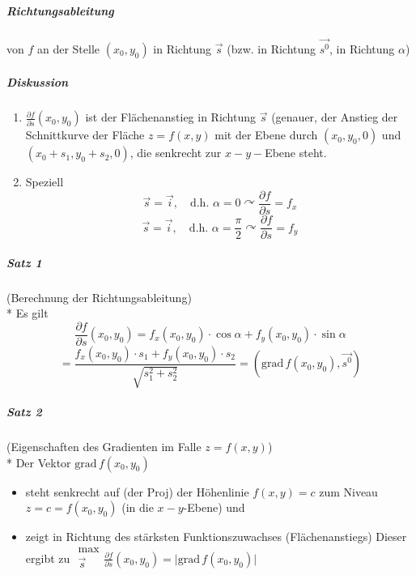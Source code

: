 \documentclass[a4paper]{scrartcl}
\begin{document}
\subparagraph{Richtungsableitung} von $f$ an der Stelle $(x_0,y_0)$ in Richtung $\vec{s}$ (bzw. in Richtung $\vec{s^0}$, in Richtung $\alpha$)

\subparagraph{Diskussion}
\begin{enumerate}
\item $\frac{\partial f}{\partial s} (x_0,y_0)$ ist der Flächenanstieg in Richtung $\vec{s}$ (genauer, der Anstieg der Schnittkurve der Fläche $z=f(x,y)$ mit der Ebene durch $(x_0,y_0,0)$ und $(x_0+s_1, y_0 +s_2,0)$, die senkrecht zur $x-y-$Ebene steht.
\item Speziell
\[\vec{s} = \vec{i}, \quad \text{d.h. } \alpha = 0 \curvearrowright \frac{\partial f}{\partial s} = f_x\]
\[\vec{s} = \vec{i}, \quad \text{d.h. } \alpha = \frac{\pi}{2} \curvearrowright \frac{\partial f}{\partial s} = f_y \]
\end{enumerate}

\subparagraph{Satz 1} (Berechnung der Richtungsableitung)\\*
Es gilt 
\[\frac{\partial f}{\partial s} (x_0,y_0) = f_x (x_0,y_0) \cdot \cos{\alpha} + f_y (x_0,y_0) \cdot \sin{\alpha}\]
\[ = \frac{f_x (x_0,y_0) \cdot s_1 + f_y(x_0,y_0) \cdot s_2}{\sqrt{s_1^2 + s_2^2}} = \left ( \text{grad} \, f(x_0,y_0), \vec{s^0} \right ) \]

\subparagraph{Satz 2} (Eigenschaften des Gradienten im Falle $z=f(x,y)$)\\*
Der Vektor $\text{grad} \, f(x_0,y_0)$
\begin{itemize}
\item steht senkrecht auf (der Proj) der Höhenlinie $f(x,y) = c $ zum Niveau $z=c=f(x_0,y_0)$ (in die $x-y$-Ebene) und 
\item zeigt in Richtung des stärksten Funktionszuwachses (Flächenanstiegs) Dieser ergibt zu $\begin{array}{c} \text{max} \\ \vec{s} \\ \end{array} \frac{\partial f}{\partial s} (x_0,y_0) = \lvert \text{grad} \, f(x_0,y_0) \rvert$
\end{itemize}
\end{document}
